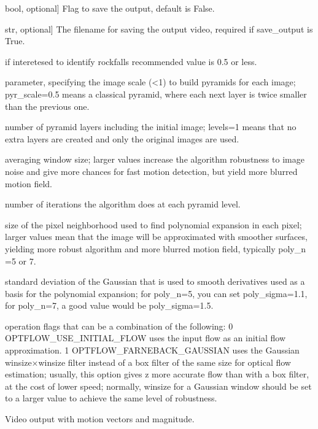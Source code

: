 \documentclass[letterpaper,10pt,english]{sphinxmanual}
\begin{document}
\begin{fulllineitems}
\begin{description}
\sphinxlineitem{save\_output}{[}bool, optional{]}
\sphinxAtStartPar
Flag to save the output, default is False.

\sphinxlineitem{output\_filename}{[}str, optional{]}
\sphinxAtStartPar
The filename for saving the output video, required if save\_output is True.

\sphinxAtStartPar
if interetesed to identify rockfalls recommended value is 0.5 or less.

\sphinxAtStartPar
parameter, specifying the image scale (\textless{}1) to build pyramids for each image; pyr\_scale=0.5 means a classical pyramid, where each next layer is twice smaller than the previous one.

\sphinxAtStartPar
number of pyramid layers including the initial image; levels=1 means that no extra layers are created and only the original images are used.

\sphinxAtStartPar
averaging window size; larger values increase the algorithm robustness to image noise and give more chances for fast motion detection, but yield more blurred motion field.

\sphinxAtStartPar
number of iterations the algorithm does at each pyramid level.

\sphinxAtStartPar
size of the pixel neighborhood used to find polynomial expansion in each pixel; 
larger values mean that the image will be approximated with smoother surfaces, 
yielding more robust algorithm and more blurred motion field, typically poly\_n =5 or 7.

\sphinxAtStartPar
standard deviation of the Gaussian that is used to smooth derivatives used as a basis for the polynomial expansion; 
for poly\_n=5, you can set poly\_sigma=1.1, for poly\_n=7, a good value would be poly\_sigma=1.5.

\sphinxAtStartPar
operation flags that can be a combination of the following:
0 OPTFLOW\_USE\_INITIAL\_FLOW uses the input flow as an initial flow approximation.
1 OPTFLOW\_FARNEBACK\_GAUSSIAN uses the Gaussian winsize×winsize filter instead of a box filter of the same size for optical flow estimation; 
usually, this option gives z more accurate flow than with a box filter, at the cost of lower speed; 
normally, winsize for a Gaussian window should be set to a larger value to achieve the same level of robustness.

\sphinxAtStartPar
Video output with motion vectors and magnitude.

\end{description}

\end{fulllineitems}
\end{document}
